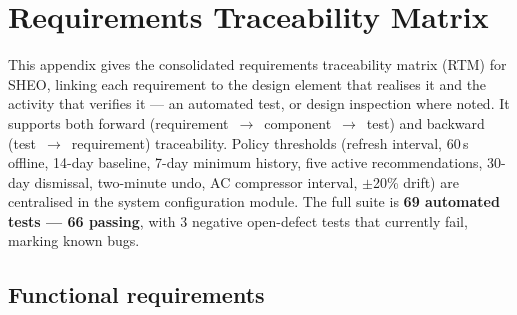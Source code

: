 \chapter{Requirements Traceability Matrix}
\label{app:rtm}

This appendix gives the consolidated requirements traceability matrix (RTM) for SHEO,
linking each requirement to the design element that realises it and the activity that
verifies it --- an automated test, or design inspection where noted. It supports both forward (requirement~$\rightarrow$~component~$\rightarrow$~test)
and backward (test~$\rightarrow$~requirement) traceability. Policy thresholds (refresh
interval, 60\,s offline, 14-day baseline, 7-day minimum history, five active
recommendations, 30-day dismissal, two-minute undo, AC compressor interval, $\pm$20\%
drift) are centralised in the system configuration module. The full suite is \textbf{69 automated tests
--- 66 passing}, with 3 negative open-defect tests that currently fail, marking known bugs.

\section{Functional requirements}

